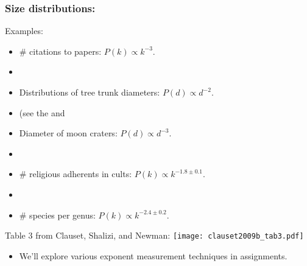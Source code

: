 \begin{frame}
  \frametitle{Size distributions:}

  \begin{block}{Examples:}
    \begin{itemize}
    \item 
      \# citations to papers:\cite{price1965a,price1976a} $P(k) \propto k^{-3}$.
    \item 
    \item 
      Distributions of tree trunk diameters: $P(d) \propto d^{-2}$.
    \item 
      (see the 
      and 
    \item 
      Diameter of moon craters:\cite{newman2005b} $P(d) \propto d^{-3}$.
    \item 
    \item 
      \# religious adherents in cults:\cite{clauset2009b} 
      $P(k) \propto k^{-1.8 \pm 0.1}.$
    \item
    \item
      \# species per genus:\cite{yule1924a,simon1955a,clauset2009b} 
      $P(k) \propto k^{-2.4 \pm 0.2}.$
    \end{itemize}
  \end{block}





\end{frame}


\begin{frame}[plain]

  \begin{block}{Table 3 from Clauset, Shalizi, and Newman\cite{clauset2009b}:}
    \texttt{[image: clauset2009b\_tab3.pdf]}
  \end{block}

  \begin{itemize}
  \item 
    We'll explore various exponent measurement techniques in assignments.
  \end{itemize}
  
\end{frame}

